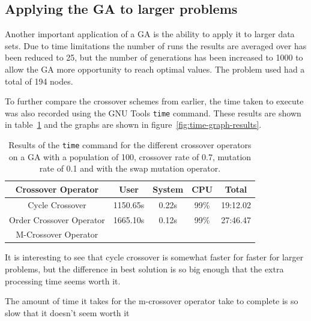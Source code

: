\documentclass[10pt, a4paper]{article}
\begin{document}
\subsection{Applying the GA to larger problems}

Another important application of a GA is the ability to apply it to larger data
sets. Due to time limitations the number of runs the results are averaged over
has been reduced to 25, but the number of generations has been increased to 
1000 to allow the GA more opportunity to reach optimal values. The problem used
had a total of 194 nodes.

To further compare the crossover schemes from earlier, the time taken to
execute was also recorded using the GNU Tools \texttt{time} command. These
results are shown in table~\ref{tab:time-results} and the graphs are shown in
figure~\ref{fig:time-graph-results}.

\begin{table}[h]
\centering
\begin{tabular}{|c|c|c|c|c|} \hline
\textbf{Crossover Operator}	& \textbf{User}	&\textbf{System}&\textbf{CPU}	& \textbf{Total} \\ \hline
Cycle Crossover			& 1150.65s	& 0.22s		& 99\%		& 19:12.02 \\ \hline
Order Crossover Operator	& 1665.10s	& 0.12s		& 99\%		& 27:46.47 \\ \hline
M-Crossover Operator		& 		& 		& 		& \\ \hline
\end{tabular}
\caption{Results of the \texttt{time} command for the different crossover
         operators on a GA with a population of 100, crossover rate of 0.7,
         mutation rate of 0.1 and with the swap mutation operator.}
\label{tab:time-results}
\end{table}

It is interesting to see that cycle crossover is somewhat faster for faster for
larger problems, but the difference in best solution is so big enough that the
extra processing time seems worth it.

The amount of time it takes for the m-crossover operator take to complete is so
slow that it doesn't seem worth it %
\end{document}
